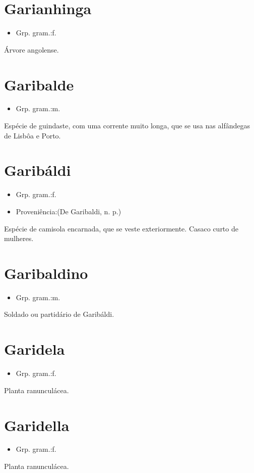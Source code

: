 \section{Garianhinga}
\begin{itemize}
\item {Grp. gram.:f.}
\end{itemize}
Árvore angolense.
\section{Garibalde}
\begin{itemize}
\item {Grp. gram.:m.}
\end{itemize}
Espécie de guindaste, com uma corrente muito longa, que se usa nas alfândegas de Lisbôa e Porto.
\section{Garibáldi}
\begin{itemize}
\item {Grp. gram.:f.}
\end{itemize}
\begin{itemize}
\item {Proveniência:(De \textunderscore Garibaldi\textunderscore , n. p.)}
\end{itemize}
Espécie de camisola encarnada, que se veste exteriormente.
Casaco curto de mulheres.
\section{Garibaldino}
\begin{itemize}
\item {Grp. gram.:m.}
\end{itemize}
Soldado ou partidário de Garibáldi.
\section{Garidela}
\begin{itemize}
\item {Grp. gram.:f.}
\end{itemize}
Planta ranunculácea.
\section{Garidella}
\begin{itemize}
\item {Grp. gram.:f.}
\end{itemize}
Planta ranunculácea.
